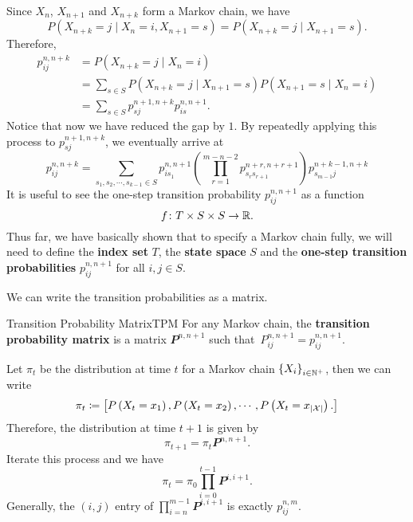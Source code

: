 \documentclass[math, code]{amznotes}
\theoremstyle{remark}
\begin{document}
Since $X_n$, $X_{n + 1}$ and $X_{n + k}$ form a Markov chain, we have
\begin{equation*}
    P\left(X_{n + k} = j \mid X_n = i, X_{n + 1} = s\right) = P\left(X_{n + k} = j \mid X_{n + 1} = s\right).
\end{equation*}
Therefore, 
\begin{align*}
    p_{ij}^{n, n + k} & = P\left(X_{n + k} = j \mid X_n = i\right) \\
    & = \sum_{s \in S}P\left(X_{n + k} = j \mid X_{n + 1} = s\right)P\left(X_{n + 1} = s \mid X_n = i\right) \\
    & = \sum_{s \in S}p_{sj}^{n + 1, n + k}p_{is}^{n, n + 1}.
\end{align*}
Notice that now we have reduced the gap by $1$. By repeatedly applying this process to $p_{sj}^{n + 1, n + k}$, we eventually arrive at 
\begin{equation*}
    p_{ij}^{n, n + k} = \sum_{s_1, s_2, \cdots, s_{k - 1} \in S}p_{is_1}^{n, n + 1}\left(\prod_{r = 1}^{m - n - 2}p_{s_rs_{r + 1}}^{n + r, n + r + 1}\right)p_{s_{m - 1}j}^{n + k - 1, n + k}
\end{equation*}
It is useful to see the one-step transition probability $p_{ij}^{n, n + 1}$ as a function 
\begin{equation*}
    f \colon T \times S \times S \to \mathbb{R}.
\end{equation*}
Thus far, we have basically shown that to specify a Markov chain fully, we will need to define the \textbf{index set} $T$, the \textbf{state space} $S$ and the \textbf{one-step transition probabilities} $p_{ij}^{n, n + 1}$ for all $i, j \in S$. 

We can write the transition probabilities as a matrix.
\begin{dfnbox}{Transition Probability Matrix}{TPM}
    For any Markov chain, the {\color{red} \textbf{transition probability matrix}} is a matrix $\mathbfit{P}^{n, n + 1}$ such that~$P^{n, n + 1}_{ij} = p_{ij}^{n, n + 1}$.
\end{dfnbox}
Let $\pi_t$ be the distribution at time $t$ for a Markov chain $\left\{X_i\right\}_{i \in \mathbb{N}^+}$, then we can write 
\begin{equation*}
    \pi_t \coloneqq \begin{bmatrix}
        P\left(X_t = x_1\right), P\left(X_t = x_2\right), \cdots, P\left(X_t = x_{{\left\lvert {\mathcal{X}} \right\rvert}}\right).
    \end{bmatrix}
\end{equation*}
Therefore, the distribution at time $t + 1$ is given by 
\begin{equation*}
    \pi_{t + 1} = \pi_t\mathbfit{P}^{n, n + 1}.
\end{equation*}
Iterate this process and we have 
\begin{equation*}
    \pi_t = \pi_0\prod_{i = 0}^{t - 1}\mathbfit{P}^{i, i + 1}.
\end{equation*}
Generally, the $\left(i, j\right)$ entry of $\prod_{i = n}^{m - 1}\mathbfit{P}^{i, i + 1}$ is exactly $p_{ij}^{n, m}$.
\end{document}
